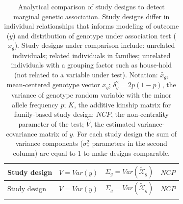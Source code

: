 \documentclass[]{book}
\begin{document}
\begin{longtable}[]{@{}llll@{}}
\caption{\label{tab:assoc-gen} Analytical comparison of study designs to
detect marginal genetic association. Study designs differ in individual
relationships that informs modeling of outcome (\(y\)) and distribution
of genotype under association test (\(x_g\)). Study designs under
comparison include: unrelated individuals; related individuals in
families; unrelated individuals with a grouping factor such as
house-hold (not related to a variable under test). Notation:
\(\tilde{x_g}\), mean-centered genotype vector \(x_g\);
\(\delta_g^2 = 2 p (1 - p)\), the variance of genotype random variable
with the minor allele frequency \(p\); \(K\), the additive kinship
matrix for family-based study design; \(NCP\), the non-centrality
parameter of the test; \(\hat{V}\), the estimated variance-covariance
matrix of \(y\). For each study design the sum of variance components
(\(\sigma^2_{*}\) parameters in the second column) are equal to 1 to
make designs comparable.}\tabularnewline
\toprule
\begin{minipage}[b]{0.21\columnwidth}\raggedright\strut
Study design\strut
\end{minipage} & \begin{minipage}[b]{0.15\columnwidth}\raggedright\strut
\(V = Var(y)\)\strut
\end{minipage} & \begin{minipage}[b]{0.16\columnwidth}\raggedright\strut
\(\Sigma_g = Var(\mathcal{\tilde{X}}_g)\)\strut
\end{minipage} & \begin{minipage}[b]{0.37\columnwidth}\raggedright\strut
\(NCP\)\strut
\end{minipage}\tabularnewline
\midrule
\endfirsthead
\toprule
\begin{minipage}[b]{0.21\columnwidth}\raggedright\strut
Study design\strut
\end{minipage} & \begin{minipage}[b]{0.15\columnwidth}\raggedright\strut
\(V = Var(y)\)\strut
\end{minipage} & \begin{minipage}[b]{0.16\columnwidth}\raggedright\strut
\(\Sigma_g = Var(\mathcal{\tilde{X}}_g)\)\strut
\end{minipage} & \begin{minipage}[b]{0.37\columnwidth}\raggedright\strut
\(NCP\)\strut
\end{minipage}\tabularnewline
\midrule
\endhead
\begin{minipage}[t]{0.21\columnwidth}\raggedright\strut

\end{minipage}
\end{longtable}
\end{document}
